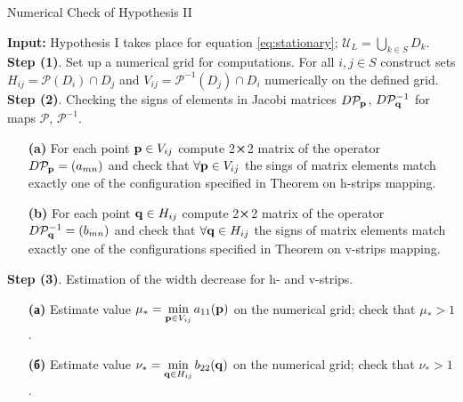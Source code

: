 \documentclass[candidate, href, colorlinks]{disser}
\begin{document}
\begin{algorithm}[H]
\caption{Numerical Check of Hypothesis II}
\label{algorithm:hypotheses-validation}
\begin{algorithmic}
	\STATE \textbf{Input:} Hypothesis I takes place for equation \eqref{eq:stationary}; $\mathscr{U}_L = \bigcup_{k \in S} D_k$.
	\STATE \textbf{Step (1)}. Set up a numerical grid for computations.
		For all $i, j \in S$ construct sets $H_{ij} = \mathcal{P}(D_i) \cap D_j$ and $V_{ij} = \mathcal{P}^{-1} (D_j) \cap D_i$ numerically on the defined grid.
	\STATE \textbf{Step (2)}. Checking the signs of elements in Jacobi matrices $D \mathcal{P}_{\vb{p}}$, $D \mathcal{P}_{\vb{q}}^{-1}$ for maps $\mathcal{P}$, $\mathcal{P}^{-1}$.
	\STATE
	\begin{enumerate}
		\setlength{\itemsep}{1pt}
		\setlength{\parskip}{0pt}
  		\setlength{\parsep}{0pt}
		\item[\textbf{(a)}] For each point $\vb{p} \in V_{ij}$ compute 2$\cross$2 matrix of the operator $D \mathcal{P}_{\vb{p}} = (a_{mn})$ and check that $\forall \vb{p} \in V_{ij}$ the sings of matrix elements match exactly one of the configuration specified in Theorem on h-strips mapping.
		\item[\textbf{(b)}] For each point $\vb{q} \in H_{ij}$ compute 2$\cross$2 matrix of the operator $D \mathcal{P}_{\vb{q}}^{-1} = (b_{mn})$ and check that $\forall \vb{q} \in H_{ij}$ the signs of matrix elements match exactly one of the configurations specified in Theorem on v-strips mapping.
	\end{enumerate}
	\STATE \textbf{Step (3)}. Estimation of the width decrease for h- and v-strips.
	\STATE
	\begin{enumerate}
		\setlength{\itemsep}{1pt}
		\setlength{\parskip}{0pt}
  		\setlength{\parsep}{0pt}
		\item[\textbf{(а)}] Estimate value $\mu_* = \min \limits_{\vb{p} \in V_{ij}} a_{11}(\vb{p})$ on the numerical grid; check that $\mu_* > 1$.
		\item[\textbf{(б)}] Estimate value $\nu_* = \min \limits_{\vb{q} \in H_{ij}} b_{22}(\vb{q})$ on the numerical grid; check that $\nu_* > 1$.
	\end{enumerate}
\end{algorithmic}
\end{algorithm}
\end{document}
